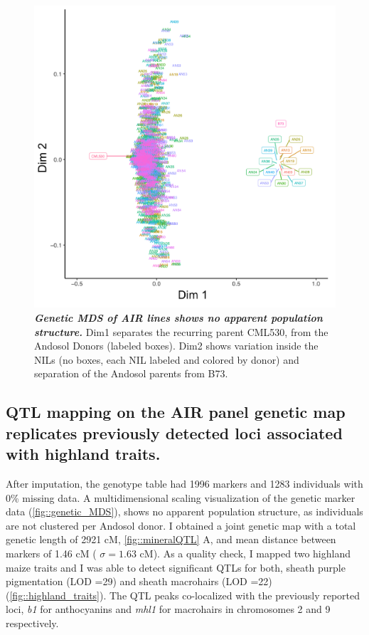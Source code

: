 \begin{figure}[!ht]
\includegraphics[width=\linewidth]{Chapter-4/figs/genetic_MDS.png}
\caption[Genetic MDS of AIR lines]{\textit{\textbf{Genetic MDS of AIR lines shows no apparent population structure.}}
Dim1 separates the recurring parent CML530,  from the Andosol Donors (labeled boxes). Dim2 shows variation inside the NILs (no boxes, each NIL labeled and colored by donor) and  separation of the Andosol parents from  B73.}
\label{fig::genetic_MDS}
\end{figure}

\clearpage

\subsection{QTL mapping on the AIR panel genetic map replicates previously detected loci associated with highland traits.}
After imputation, the genotype table had 1996 markers and 1283 individuals with 0\% missing data. 
A multidimensional scaling visualization of the genetic marker data (\autoref{fig::genetic_MDS}), shows no apparent population structure, as individuals are not clustered per Andosol donor. 
I obtained a joint genetic map with a total genetic length of  2921 cM, \autoref{fig::mineralQTL} A, and  mean distance between markers of 1.46 cM ( $\sigma = 1.63$ cM).
As a quality check, I mapped two highland maize traits \citep{ janzen2022, perez-limon2022, lauter2004} and I was able to detect significant QTLs for both, sheath purple pigmentation (LOD =29) and sheath macrohairs (LOD =22)(\autoref{fig::highland_traits}).
The QTL peaks co-localized with the previously reported loci, \textit{b1} for anthocyanins \citep{perez-limon2022,chandler1989} and \textit{mhl1} for macrohairs \citep{perez-limon2022,calfee2021-mr, moose2004} in chromosomes 2 and 9 respectively. 


